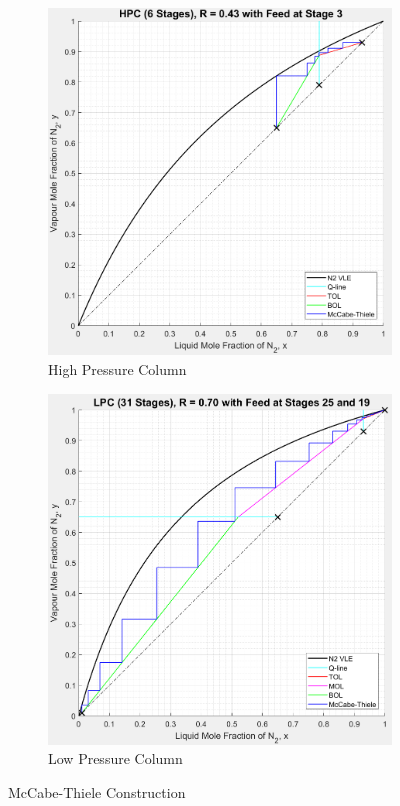 \documentclass[11pt,oneside]{article}
\begin{document}
    \begin{figure}[H]
        \begin{subfigure}{0.49\textwidth}
            \includegraphics[width=\linewidth]{HPC_v1.jpeg}
            \caption{High Pressure Column}
            \label{fig:HPC_v1}
        \end{subfigure}
        \hspace*{\fill} %
        \begin{subfigure}{0.49\textwidth}
            \includegraphics[width=\linewidth]{LPC_v1.jpeg}
            \caption{Low Pressure Column}
            \label{fig:LPC_v1}
        \end{subfigure}
        \caption{McCabe-Thiele Construction}                        \label{fig:mccabe_v1}
    \end{figure}
\end{document}
